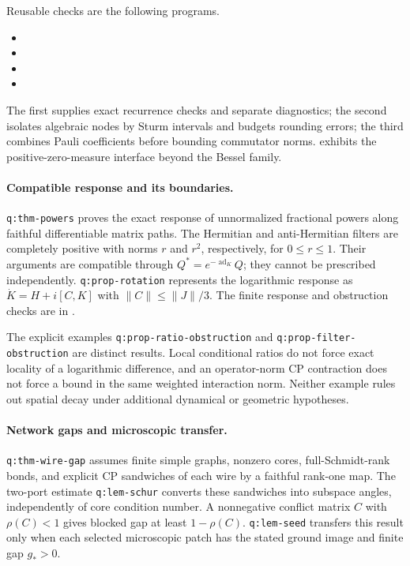 Reusable checks are the following programs.
\begin{itemize}[nosep]
\item {}
\item {}
\item {}
\item {}
\end{itemize}
The first supplies exact recurrence checks and separate diagnostics;
the second isolates algebraic nodes by Sturm intervals and budgets
rounding errors; the third combines Pauli coefficients before bounding
commutator norms. 
exhibits the positive-zero-measure interface beyond the Bessel family.

\paragraph{Compatible response and its boundaries.}
\texttt{q:thm-powers} proves the exact response of unnormalized
fractional powers along faithful differentiable matrix paths.
The Hermitian and anti-Hermitian filters are completely positive with
norms $r$ and $r^2$, respectively, for $0\le r\le1$.
Their arguments are compatible through
$Q^*=e^{-\operatorname{ad}_K}Q$; they cannot be prescribed independently.
\texttt{q:prop-rotation} represents the logarithmic response as
$\dot K=H+i[C,K]$ with $\|C\|\le\|J\|/3$.
The finite response and obstruction checks are in
.

The explicit examples \texttt{q:prop-ratio-obstruction} and
\texttt{q:prop-filter-obstruction} are distinct results.
Local conditional ratios do not force exact locality of a logarithmic
difference, and an operator-norm CP contraction does not force a bound
in the same weighted interaction norm. Neither example rules out
spatial decay under additional dynamical or geometric hypotheses.

\paragraph{Network gaps and microscopic transfer.}
\texttt{q:thm-wire-gap} assumes finite simple graphs, nonzero cores,
full-Schmidt-rank bonds, and explicit CP sandwiches of each wire by a
faithful rank-one map. The two-port estimate \texttt{q:lem-schur}
converts these sandwiches into subspace angles, independently of core
condition number. A nonnegative conflict matrix $C$ with $\rho(C)<1$
gives blocked gap at least $1-\rho(C)$.
\texttt{q:lem-seed} transfers this result only when each selected
microscopic patch has the stated ground image and finite gap $g_*>0$.

